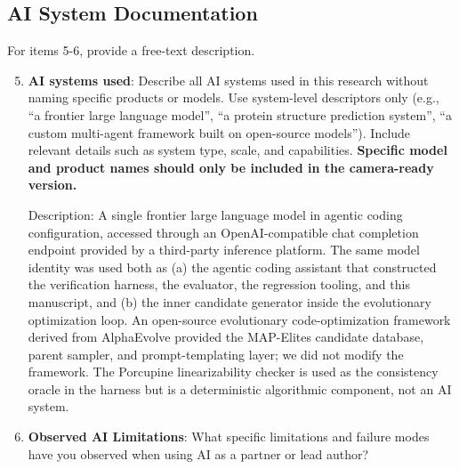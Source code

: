 \documentclass{article}
\begin{document}
\subsection*{AI System Documentation}

For items 5-6, provide a free-text description.

\begin{enumerate}
    \setcounter{enumi}{4}

    \item \textbf{AI systems used}: Describe all AI systems used in this research without naming specific products or models. Use system-level descriptors only (e.g., ``a frontier large language model'', ``a protein structure prediction system'', ``a custom multi-agent framework built on open-source models''). Include relevant details such as system type, scale, and capabilities. \textbf{Specific model and product names should only be included in the camera-ready version.}

    Description: A single frontier large language model in agentic
    coding configuration, accessed through an OpenAI-compatible chat
    completion endpoint provided by a third-party inference platform.
    The same model identity was used both as (a) the agentic coding
    assistant that constructed the verification harness, the evaluator,
    the regression tooling, and this manuscript, and (b) the inner
    candidate generator inside the evolutionary optimization loop. An
    open-source evolutionary code-optimization framework derived from
    AlphaEvolve provided the MAP-Elites candidate database, parent
    sampler, and prompt-templating layer; we did not modify the
    framework. The Porcupine linearizability checker is used as the
    consistency oracle in the harness but is a deterministic
    algorithmic component, not an AI system.

    \item \textbf{Observed AI Limitations}: What specific limitations and failure modes have you observed when using AI as a partner or lead author?


\end{enumerate}
\end{document}
